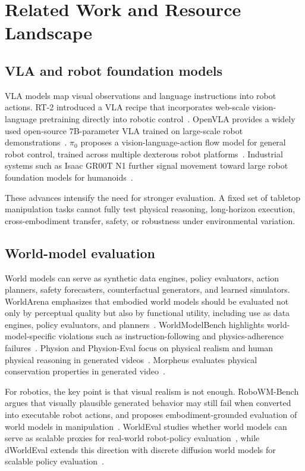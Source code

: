 \documentclass[sigconf,review,anonymous]{acmart}
\begin{document}
\section{Related Work and Resource Landscape}

\subsection{VLA and robot foundation models}

VLA models map visual observations and language instructions into robot actions. RT-2 introduced a VLA recipe that incorporates web-scale vision-language pretraining directly into robotic control~\cite{brohan2023rt2}. OpenVLA provides a widely used open-source 7B-parameter VLA trained on large-scale robot demonstrations~\cite{kim2024openvla}. $\pi_0$ proposes a vision-language-action flow model for general robot control, trained across multiple dexterous robot platforms~\cite{black2024pi0}. Industrial systems such as Isaac GR00T N1 further signal movement toward large robot foundation models for humanoids~\cite{nvidia2025groot}.

These advances intensify the need for stronger evaluation. A fixed set of tabletop manipulation tasks cannot fully test physical reasoning, long-horizon execution, cross-embodiment transfer, safety, or robustness under environmental variation.

\subsection{World-model evaluation}

World models can serve as synthetic data engines, policy evaluators, action planners, safety forecasters, counterfactual generators, and learned simulators. WorldArena emphasizes that embodied world models should be evaluated not only by perceptual quality but also by functional utility, including use as data engines, policy evaluators, and planners~\cite{worldarena2026}. WorldModelBench highlights world-model-specific violations such as instruction-following and physics-adherence failures~\cite{worldmodelbench2025}. Physion and Physion-Eval focus on physical realism and human physical reasoning in generated videos~\cite{physionatlas2025,physioneval2026}. Morpheus evaluates physical conservation properties in generated video~\cite{morpheus2025}.

For robotics, the key point is that visual realism is not enough. RoboWM-Bench argues that visually plausible generated behavior may still fail when converted into executable robot actions, and proposes embodiment-grounded evaluation of world models in manipulation~\cite{jiang2026robowm}. WorldEval studies whether world models can serve as scalable proxies for real-world robot-policy evaluation~\cite{li2025worldeval}, while dWorldEval extends this direction with discrete diffusion world models for scalable policy evaluation~\cite{dworldeval2026}.
\end{document}
